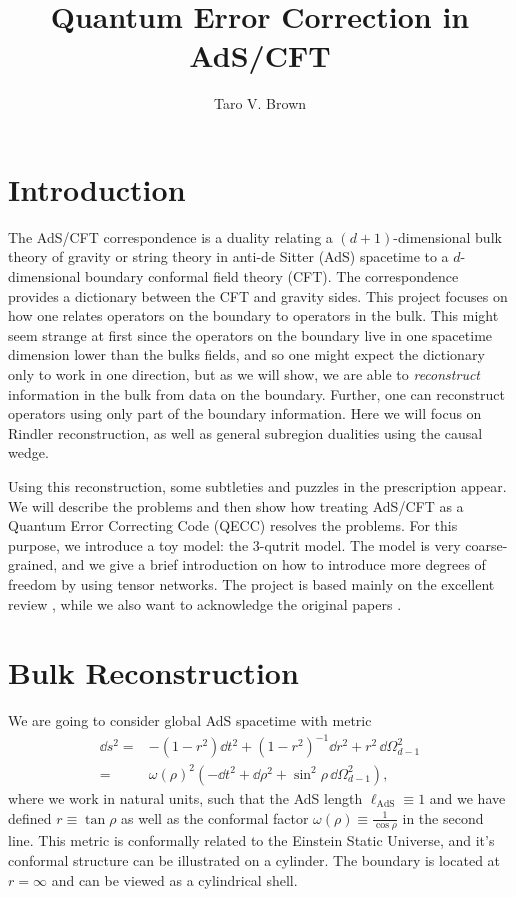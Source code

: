 \documentclass[letter,12pt]{article}
\title{Quantum Error Correction in AdS/CFT}
\author[a]{Taro V. Brown}
\affiliation[a]{Department of Physics, UC Davis, One Shields Avenue, Davis, CA 95616, USA }
\begin{document}
 
\maketitle
\flushbottom
\newpage
\section{Introduction}
The AdS/CFT correspondence is a duality relating a
$(d+1)$-dimensional bulk theory of gravity or string theory in anti-de Sitter (AdS) spacetime to a $d$-dimensional boundary conformal field theory (CFT). The correspondence provides a dictionary between the CFT and gravity sides. This project focuses on how one relates operators on the boundary to operators in the bulk. This might seem strange at first since the operators on the boundary live in one spacetime dimension lower than the bulks fields, and so one might expect the dictionary only to work in one direction, but as we will show, we are able to \textit{reconstruct} information in the bulk from data on the boundary. Further, one can reconstruct operators using only part of the boundary information. Here we will focus on Rindler reconstruction, as well as general subregion dualities using the causal wedge. 

Using this reconstruction, some subtleties and puzzles in the prescription appear. We will describe the problems and then show how treating AdS/CFT as a Quantum Error Correcting Code (QECC) resolves the problems. For this purpose, we introduce a toy model: the 3-qutrit model. The model is very coarse-grained, and we give a brief introduction on how to introduce more degrees of freedom by using tensor networks. The project is based mainly on the excellent review \cite{bib1}, while we also want to acknowledge the original papers \cite{bib2,bib3,bib4}. 
\section{Bulk Reconstruction \label{sec:1}}
We are going to consider global AdS spacetime with metric
\begin{equation}
	\begin{aligned}
		\dd s^2=&-\left(1-r^2\right)\dd t^2+\left(1-r^2\right)^{-1}\dd r^2+r^2\,\dd\Omega_{d-1}^2
		\\
		=&\omega(\rho)^2\left(-\dd t^2+\dd \rho^2+\sin^2\rho\,\dd\Omega_{d-1}^2 \right),
	\end{aligned}
\end{equation}
where we work in natural units, such that the AdS length $\ell_{\text{AdS}}\equiv 1$ and we have defined $r\equiv \tan\rho $ as well as the conformal factor $\omega(\rho)\equiv \frac{1}{\cos\rho}$ in the second line. This metric is conformally related to the Einstein Static Universe, and it's conformal structure can be illustrated on a cylinder. The boundary is located at $r=\infty$ and can be viewed as a cylindrical shell.
\end{document}
